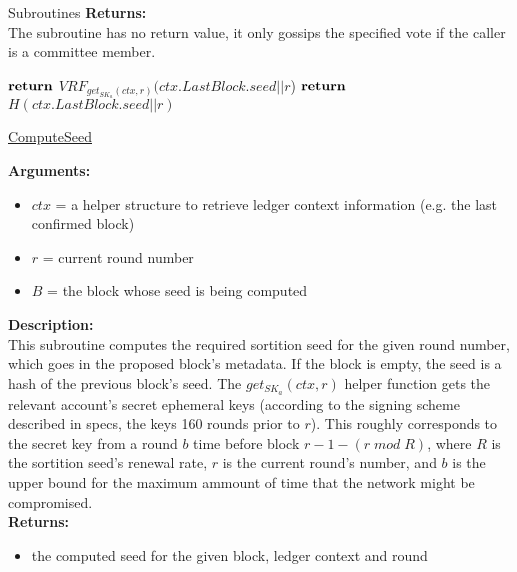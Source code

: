 \documentclass[10pt,a4paper]{article}
\begin{document}
\begin{section}{Subroutines}
\noindent \textbf{Returns:}\\
The subroutine has no return value, it only gossips the specified vote if the caller is a committee member.


\begin{algorithm}[H]
    \begin{algorithmic}[H]
            \State $\Return$ $VRF_{get_{SK_a}(ctx, r)}(ctx.LastBlock.seed||r$)
        \Else
            \State $\Return$ $H(ctx.LastBlock.seed||r)$
        \EndIf
    \EndFunction
    \end{algorithmic}
    \caption{\underline{ComputeSeed}}
\end{algorithm}


\noindent \textbf{Arguments:}
\begin{itemize}
    \item $ctx$ = a helper structure to retrieve ledger context information (e.g. the last confirmed block)
    \item $r$ = current round number
    \item $B$ = the block whose seed is being computed
  \end{itemize}


\noindent \textbf{Description:}\\
This subroutine computes the required sortition seed for the given round number, which goes in the proposed block's metadata.
If the block is empty, the seed is a hash of the previous block's seed.
The $get_{SK_a}(ctx, r)$ helper function gets the relevant account's secret ephemeral keys (according to the signing scheme described in specs, the keys 160 rounds prior to $r$).
This roughly corresponds to the secret key from a round $b$ time before block $r-1-(r\;mod\;R)$, where $R$ is the sortition seed's renewal rate, $r$ is the current round's number,
and $b$ is the upper bound for the maximum ammount of time that the network might be compromised.\\

\noindent \textbf{Returns:}
\begin{itemize}
    \item the computed seed for the given block, ledger context and round
  \end{itemize}



\end{section}
\end{document}
